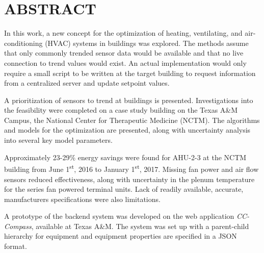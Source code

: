 %
%
%

\chapter*{\texorpdfstring{\MakeUppercase{ABSTRACT}}{ABSTRACT}}

\pagestyle{plain} %
\setcounter{page}{2}

\indent  In this work, a new concept for the optimization of heating,
ventilating, and air-conditioning (HVAC) systems in buildings was
explored. The methods assume that only commonly trended sensor data
would be available and that no live connection to trend values would
exist.  An actual implementation would only require a small script to be
written at the target building to request information from a centralized
server and update setpoint values. 

A prioritization of sensors to trend at buildings is presented.
Investigations into the feasibility were completed on a case study
building on the Texas A\&M Campus, the National Center for Therapeutic
Medicine (NCTM). The algorithms and models for the optimization are
presented, along with uncertainty analysis into several key model
parameters. 

Approximately 23-29\% energy savings were found for AHU-2-3 at the NCTM
building from June 1\textsuperscript{st}, 2016 to January
1\textsuperscript{st}, 2017.  Missing fan power and air flow sensors
reduced effectiveness, along with uncertainty in the plenum temperature
for the series fan powered terminal units. Lack of readily available,
accurate, manufacturers specifications were also limitations.  

A prototype of the backend system was developed on the web application
\textit{CC-Compass}, available at Texas A\&M. The system was set up with
a parent-child hierarchy for equipment and equipment properties are
specified in a JSON format. 
 

\pagebreak{}
